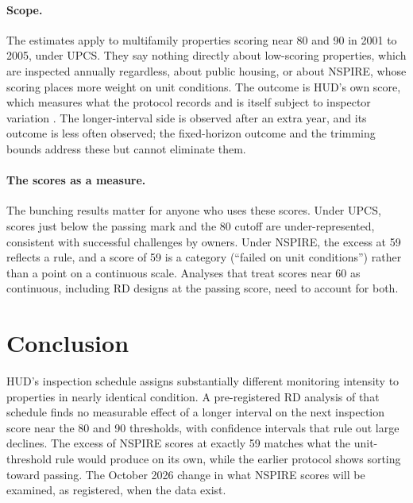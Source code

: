 \documentclass[11pt,letterpaper]{article}
\begin{document}
\paragraph{Scope.} The estimates apply to multifamily properties scoring near 80 and 90 in 2001 to 2005, under UPCS. They say nothing directly about low-scoring properties, which are inspected annually regardless, about public housing, or about NSPIRE, whose scoring places more weight on unit conditions. The outcome is HUD's own score, which measures what the protocol records and is itself subject to inspector variation \citep{gao2019}. The longer-interval side is observed after an extra year, and its outcome is less often observed; the fixed-horizon outcome and the trimming bounds address these but cannot eliminate them.

\paragraph{The scores as a measure.} The bunching results matter for anyone who uses these scores. Under UPCS, scores just below the passing mark and the 80 cutoff are under-represented, consistent with successful challenges by owners. Under NSPIRE, the excess at 59 reflects a rule, and a score of 59 is a category (``failed on unit conditions'') rather than a point on a continuous scale. Analyses that treat scores near 60 as continuous, including RD designs at the passing score, need to account for both.

\section{Conclusion}
HUD's inspection schedule assigns substantially different monitoring intensity to properties in nearly identical condition. A pre-registered RD analysis of that schedule finds no measurable effect of a longer interval on the next inspection score near the 80 and 90 thresholds, with confidence intervals that rule out large declines. The excess of NSPIRE scores at exactly 59 matches what the unit-threshold rule would produce on its own, while the earlier protocol shows sorting toward passing. The October 2026 change in what NSPIRE scores will be examined, as registered, when the data exist.
\end{document}

